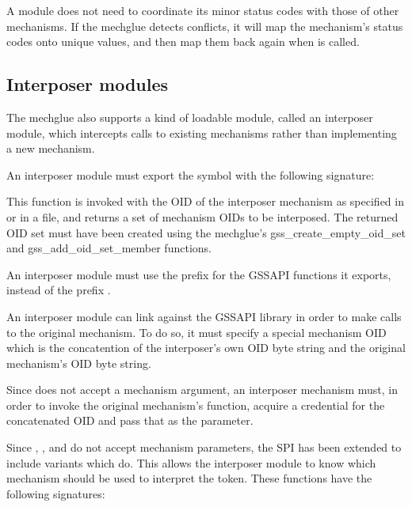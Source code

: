 \documentclass[letterpaper,10pt,english]{sphinxmanual}
\begin{document}
A module does not need to coordinate its minor status codes with those
of other mechanisms.  If the mechglue detects conflicts, it will map
the mechanism’s status codes onto unique values, and then map them
back again when  is called.


\subsection{Interposer modules}
\label{\detokenize{plugindev/gssapi:interposer-modules}}
The mechglue also supports a kind of loadable module, called an
interposer module, which intercepts calls to existing mechanisms
rather than implementing a new mechanism.

An interposer module must export the symbol 
with the following signature:

%
\begin{sphinxVerbatim}[commandchars=\\\{\}]
  
\end{sphinxVerbatim}

This function is invoked with the OID of the interposer mechanism as
specified in  or in a 
file, and returns a set of mechanism OIDs to be interposed.  The
returned OID set must have been created using the mechglue’s
gss\_create\_empty\_oid\_set and gss\_add\_oid\_set\_member functions.

An interposer module must use the prefix  for the GSSAPI
functions it exports, instead of the prefix .

An interposer module can link against the GSSAPI library in order to
make calls to the original mechanism.  To do so, it must specify a
special mechanism OID which is the concatention of the interposer’s
own OID byte string and the original mechanism’s OID byte string.

Since  does not accept a mechanism argument,
an interposer mechanism must, in order to invoke the original
mechanism’s function, acquire a credential for the concatenated OID
and pass that as the  parameter.

Since , , and
 do not accept mechanism parameters, the SPI
has been extended to include variants which do.  This allows the
interposer module to know which mechanism should be used to interpret
the token.  These functions have the following signatures:
\end{document}
